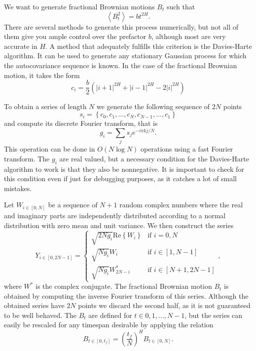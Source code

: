 We want to generate fractional Brownian motions $B_t$ such that
\begin{equation}
    \label{eq:fbm}
    \left\langle B_t^2 \right\rangle = bt^{2H}.
\end{equation}
There are several methods to generate this process numerically, but not all of
them give you ample control over the prefactor $b$, although most are very
accurate in $H$. A method that adequately fulfills this criterion is the
Davies-Harte algorithm. It can be used to generate any stationary Gaussian
process for which the autocovariance sequence is known. In the case of
the fractional Brownian motion, it takes the form
\begin{equation}
    c_i = \frac{b}{2} \left(
            \left|i+1\right|^{2H} +
            \left|i-1\right|^{2H} -
            2\left|i\right|^{2H}
          \right)
\end{equation}

To obtain a series of length $N$ we generate the following sequence of $2N$
points
\begin{equation}
    s_i=\left\{c_{0},c_{1},\ldots,c_{N},c_{N-1},\ldots,c_{1}\right\}
\end{equation}
and compute its discrete Fourier transform, that is
\begin{equation}
    g_{i}=\sum_{j}s_{j}e^{-i\pi kj/N}.
\end{equation}
This operation can be done in $O(N\log N)$ operations using a fast Fourier
transform. The $g_i$ are real valued, but a necessary condition for the
Davies-Harte algorithm to work is that they also be nonnegative. It is
important to check for this condition even if just for debugging purposes,
as it catches a lot of small mistakes.

Let $W_{i\in[0,N]}$ be a sequence of $N+1$ random complex numbers where the
real and imaginary parts are independently distributed according to a normal
distribution with zero mean and unit variance. We then construct the series
\begin{equation}
    Y_{i\in[0,2N-1]}=\begin{cases}
        \sqrt{2Ng_{i}}\mbox{Re}\left\{ W_{i}\right\}  & \mbox{if } i=0,N\\
        \sqrt{Ng_{i}}W_{i} & \mbox{if } i\in\left[1, N-1\right]\\
        \sqrt{Ng_{i}}W_{2N-i}^{*} & \mbox{if } i\in\left[N+1, 2N-1\right]
    \end{cases},
\end{equation}
where $W^{*}$ is the complex conjugate. The fractional Brownian motion $B_t$ is
obtained by computing the inverse Fourier transform of this series. Although
the obtained series have $2N$ points we discard the second half, as it is not
guaranteed to be well behaved. The $B_t$ are defined for $t\in{0,1,\ldots,N-1}$,
but the series can easily be rescaled for any timespan desirable by applying
the relation
\begin{equation}
    B_{t\in[0,t_{f}]}={\left(\frac{t_{f}}{N}\right)}^{H}B_{t\in[0,N]}.
\end{equation}

